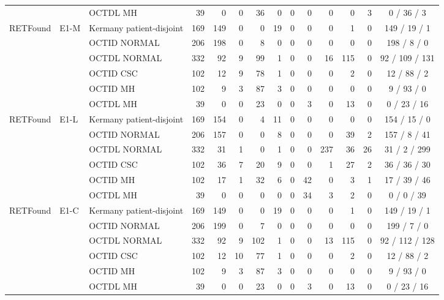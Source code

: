 \begin{longtable}{@{}lll rrrrrrrrrrc@{}}
 &  & OCTDL MH & 39 & 0 & 0 & 36 & 0 & 0 & 0 & 0 & 0 & 3 & 0 / 36 / 3 \\
\addlinespace[1pt]
RETFound & E1-M & Kermany patient-disjoint & 169 & 149 & 0 & 0 & 19 & 0 & 0 & 0 & 1 & 0 & 149 / 19 / 1 \\
 &  & OCTID NORMAL & 206 & 198 & 0 & 8 & 0 & 0 & 0 & 0 & 0 & 0 & 198 / 8 / 0 \\
 &  & OCTDL NORMAL & 332 & 92 & 9 & 99 & 1 & 0 & 0 & 16 & 115 & 0 & 92 / 109 / 131 \\
 &  & OCTID CSC & 102 & 12 & 9 & 78 & 1 & 0 & 0 & 0 & 2 & 0 & 12 / 88 / 2 \\
 &  & OCTID MH & 102 & 9 & 3 & 87 & 3 & 0 & 0 & 0 & 0 & 0 & 9 / 93 / 0 \\
 &  & OCTDL MH & 39 & 0 & 0 & 23 & 0 & 0 & 3 & 0 & 13 & 0 & 0 / 23 / 16 \\
\addlinespace[1pt]
RETFound & E1-L & Kermany patient-disjoint & 169 & 154 & 0 & 4 & 11 & 0 & 0 & 0 & 0 & 0 & 154 / 15 / 0 \\
 &  & OCTID NORMAL & 206 & 157 & 0 & 0 & 8 & 0 & 0 & 0 & 39 & 2 & 157 / 8 / 41 \\
 &  & OCTDL NORMAL & 332 & 31 & 1 & 0 & 1 & 0 & 0 & 237 & 36 & 26 & 31 / 2 / 299 \\
 &  & OCTID CSC & 102 & 36 & 7 & 20 & 9 & 0 & 0 & 1 & 27 & 2 & 36 / 36 / 30 \\
 &  & OCTID MH & 102 & 17 & 1 & 32 & 6 & 0 & 42 & 0 & 3 & 1 & 17 / 39 / 46 \\
 &  & OCTDL MH & 39 & 0 & 0 & 0 & 0 & 0 & 34 & 3 & 2 & 0 & 0 / 0 / 39 \\
\addlinespace[1pt]
RETFound & E1-C & Kermany patient-disjoint & 169 & 149 & 0 & 0 & 19 & 0 & 0 & 0 & 1 & 0 & 149 / 19 / 1 \\
 &  & OCTID NORMAL & 206 & 199 & 0 & 7 & 0 & 0 & 0 & 0 & 0 & 0 & 199 / 7 / 0 \\
 &  & OCTDL NORMAL & 332 & 92 & 9 & 102 & 1 & 0 & 0 & 13 & 115 & 0 & 92 / 112 / 128 \\
 &  & OCTID CSC & 102 & 12 & 10 & 77 & 1 & 0 & 0 & 0 & 2 & 0 & 12 / 88 / 2 \\
 &  & OCTID MH & 102 & 9 & 3 & 87 & 3 & 0 & 0 & 0 & 0 & 0 & 9 / 93 / 0 \\
 &  & OCTDL MH & 39 & 0 & 0 & 23 & 0 & 0 & 3 & 0 & 13 & 0 & 0 / 23 / 16 \\
\end{longtable}
